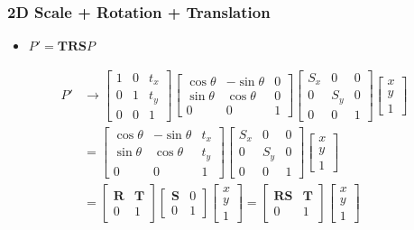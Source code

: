 \documentclass[letterpaper,12pt]{article}
\newcommand{\lra}{\ensuremath{\longrightarrow{}}}
\newcommand{\matr}[1]{\mathbf{#1}}
\begin{document}
\subsubsection{2D Scale + Rotation + Translation}
\begin{itemize}
 \item $P'= \matr{T}\matr{R}\matr{S}P$
\end{itemize}
\begin{align}
 P' & \lra \begin{bmatrix}
  1 & 0 & t_x \\
  0 & 1 & t_y \\
  0 & 0 & 1
 \end{bmatrix}
 \begin{bmatrix}
  \cos\theta & -\sin\theta & 0 \\
  \sin\theta & \cos\theta  & 0 \\
  0          & 0           & 1
 \end{bmatrix}
 \begin{bmatrix}
  S_x & 0   & 0 \\
  0   & S_y & 0 \\
  0   & 0   & 1
 \end{bmatrix}
 \begin{bmatrix}
  x \\
  y \\
  1
 \end{bmatrix}           \\
    & = \begin{bmatrix}
  \cos\theta & -\sin\theta & t_x \\
  \sin\theta & \cos\theta  & t_y \\
  0          & 0           & 1
 \end{bmatrix}
 \begin{bmatrix}
  S_x & 0   & 0 \\
  0   & S_y & 0 \\
  0   & 0   & 1
 \end{bmatrix}
 \begin{bmatrix}
  x \\
  y \\
  1
 \end{bmatrix}           \\
    & = \begin{bmatrix}
  \matr{R} & \matr{T} \\
  0        & 1
 \end{bmatrix}
 \begin{bmatrix}
  \matr{S} & 0 \\
  0        & 1
 \end{bmatrix}
 \begin{bmatrix}
  x \\
  y \\
  1
 \end{bmatrix}
 = \begin{bmatrix}
  \matr{R}\matr{S} & \matr{T} \\
  0                & 1
 \end{bmatrix}
 \begin{bmatrix}
  x \\
  y \\
  1
 \end{bmatrix}
\end{align}
\end{document}
